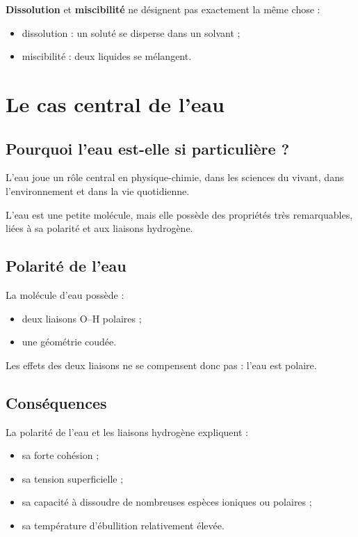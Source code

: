 \documentclass[11pt,a4paper]{article}
\begin{document}
\begin{attentionbox}
\textbf{Dissolution} et \textbf{miscibilité} ne désignent pas exactement la même chose :
\begin{itemize}
    \item dissolution : un soluté se disperse dans un solvant ;
    \item miscibilité : deux liquides se mélangent.
\end{itemize}
\end{attentionbox}

\section{Le cas central de l’eau}

\subsection{Pourquoi l’eau est-elle si particulière ?}

L’eau joue un rôle central en physique-chimie, dans les sciences du vivant, dans l’environnement et dans la vie quotidienne.

\begin{ideebox}
L’eau est une petite molécule, mais elle possède des propriétés très remarquables, liées à sa polarité et aux liaisons hydrogène.
\end{ideebox}

\subsection{Polarité de l’eau}

La molécule d’eau possède :
\begin{itemize}
    \item deux liaisons O--H polaires ;
    \item une géométrie coudée.
\end{itemize}

Les effets des deux liaisons ne se compensent donc pas : l’eau est polaire.

\subsection{Conséquences}

\begin{proprietebox}
La polarité de l’eau et les liaisons hydrogène expliquent :
\begin{itemize}
    \item sa forte cohésion ;
    \item sa tension superficielle ;
    \item sa capacité à dissoudre de nombreuses espèces ioniques ou polaires ;
    \item sa température d’ébullition relativement élevée.
\end{itemize}
\end{proprietebox}
\end{document}
